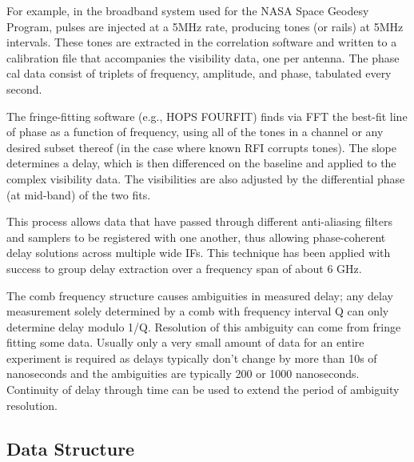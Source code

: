 \documentclass[11pt,a4paper]{article}
\begin{document}
For example, in the broadband system used for the NASA Space Geodesy
Program, pulses are injected at a 5MHz rate, producing tones (or
rails) at 5MHz intervals.  These tones are extracted in the
correlation software and written to a calibration file that
accompanies the visibility data, one per antenna. The phase cal data
consist of triplets of frequency, amplitude, and phase, tabulated
every second.

The fringe-fitting software (e.g., HOPS FOURFIT) finds via FFT the
best-fit line of phase as a function of frequency, using all of the
tones in a channel or any desired subset thereof (in the case where
known RFI corrupts tones). The slope determines a delay, which is then
differenced on the baseline and applied to the complex visibility
data.  The visibilities are also adjusted by the differential phase
(at mid-band) of the two fits.

This process allows data that have passed through different
anti-aliasing filters and samplers to be registered with one another,
thus allowing phase-coherent delay solutions across multiple wide IFs.
This technique has been applied with success to group delay extraction
over a frequency span of about 6 GHz.

The comb frequency structure causes ambiguities in measured delay; any
delay measurement solely determined by a comb with frequency interval
Q can only determine delay modulo 1/Q. Resolution of this ambiguity
can come from fringe fitting some data. Usually only a very small
amount of data for an entire experiment is required as delays
typically don’t change by more than 10s of nanoseconds and the
ambiguities are typically 200 or 1000 nanoseconds. Continuity of delay
through time can be used to extend the period of ambiguity resolution.

\subsection{Data Structure}
\end{document}
